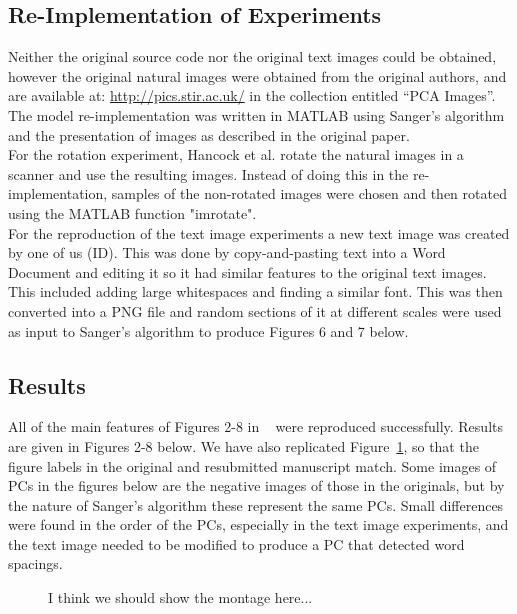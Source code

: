 \subsection{Re-Implementation of Experiments}

Neither the original source code nor the original text images could be obtained, however the original natural images were obtained from the original authors, and are available at: \url{http://pics.stir.ac.uk/} in the collection entitled
``PCA Images''. The model re-implementation was written in MATLAB using Sanger's algorithm and the presentation of images as described in the original paper.\\
For the rotation experiment, Hancock et al. rotate the natural images in a scanner and use the resulting images. Instead of doing this in the re-implementation, samples of the non-rotated images were chosen and then rotated using the MATLAB function "imrotate".\\
For the reproduction of the text image experiments a new text image was created by one of us (ID). This was done by copy-and-pasting text into a Word Document and editing it so it had similar features to the original text images. This included adding large whitespaces and finding a similar font. This was then converted into a PNG file and random sections of it at different scales were used as input to Sanger's algorithm to produce Figures 6 and 7 below. 

\subsection{Results}
All of the main features of Figures 2-8 in ~\cite{Hancock} were reproduced successfully. Results are given in Figures 2-8 below. We have also replicated Figure~\ref{fig:Figure1}, so that the figure labels in the original and resubmitted manuscript match.  Some images of PCs in the figures below are the negative images of those in the originals, but by the nature of Sanger's algorithm these represent the same PCs. Small differences were found in the order of the PCs, especially in the text image experiments, and the text image needed to be modified to produce a PC that detected word spacings.



\begin{figure}
    \centering
    \caption{I think we should show the montage here...}
    \label{fig:Figure1}
\end{figure}

